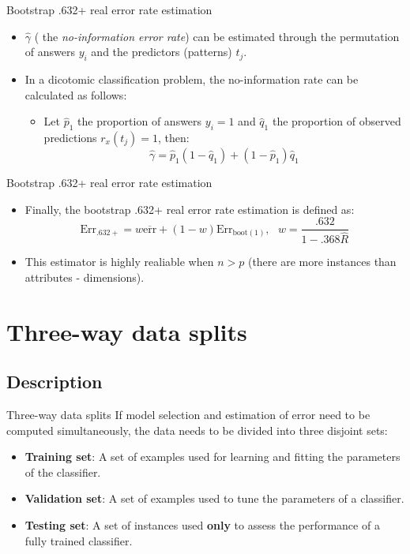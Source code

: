 \documentclass[aspectratio=169,compress,10pt]{beamer}
\begin{document}
\begin{frame}{Bootstrap .632+ real error rate estimation}
\begin{itemize}
	\item $\hat{\gamma}$ ( the \emph{no-information error rate}) can be estimated through the permutation of answers $y_i$ and the predictors (patterns) $t_j$.
	\item In a dicotomic classification problem, the no-information rate can be calculated as follows:
	\begin{itemize}
		\item Let $\hat{p}_1$ the proportion of answers $y_i = 1$  and $\hat{q}_1$ the proportion of observed predictions $r_x(t_j) = 1$, then:
		$$
			\hat{\gamma} = \hat{p}_1(1-\hat{q}_1) + (1-\hat{p}_1) \hat{q}_1
		$$
	\end{itemize}
\end{itemize}
\end{frame}

\begin{frame}{Bootstrap .632+ real error rate estimation}
\begin{itemize}
	\item Finally, the bootstrap .632+ real error rate estimation is defined as:
	\begin{equation}
		\text{Err}_{.632+} = w \overline{\text{err}} + (1 - w) \text{Err}_{\text{boot}(1)}, \text{ } w = \frac{.632}{1-.368\hat{R}}
	\end{equation}
	\item This estimator is highly realiable when $n>p$ (there are more instances than attributes - dimensions).
\end{itemize}
\end{frame}


\section{Three-way data splits}
\subsection{Description}
\begin{frame}{Three-way data splits}
If model selection and estimation of error need to be computed simultaneously, the data needs to be divided into three disjoint sets:
\begin{itemize}
	\item \textbf{Training set}: A set of examples used for learning and fitting the parameters of the classifier.
	\item \textbf{Validation set}: A set of examples used to tune the parameters of a classifier.
	\item \textbf{Testing set}: A set of instances used \textbf{only} to assess the performance of a fully trained classifier.
\end{itemize}

\end{frame}
\end{document}
